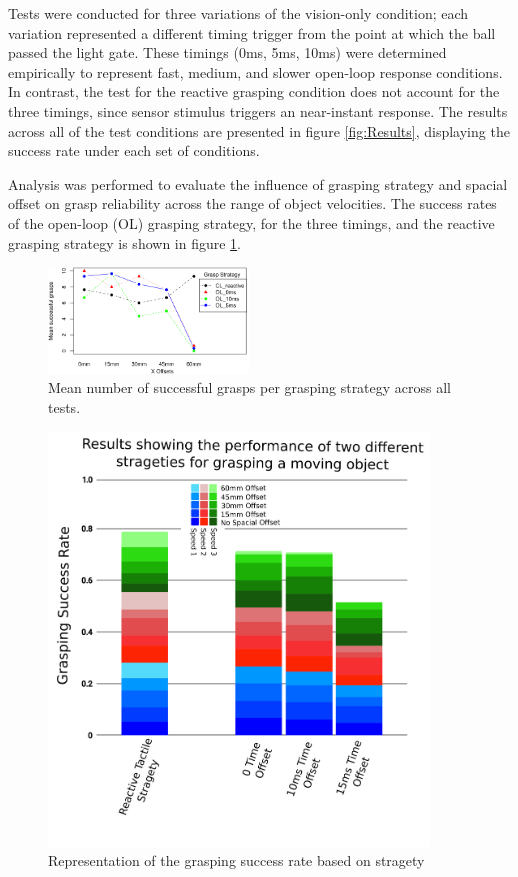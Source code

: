 Tests were conducted for three variations of the vision-only condition; each variation represented a different timing trigger from the point at which the ball passed the light gate. These timings (0ms, 5ms, 10ms) were determined empirically to represent fast, medium, and slower open-loop response conditions. In contrast, the test for the reactive grasping condition does not account for the three timings, since sensor stimulus triggers an near-instant response. The results across all of the test conditions are presented in figure \ref{fig:Results}, displaying the success rate under each set of conditions.

Analysis was performed to evaluate the influence of grasping strategy and spacial offset on grasp reliability across the range of object velocities. The success rates of the open-loop (OL) grasping strategy, for the three timings, and the reactive grasping strategy is shown in figure \ref{fig:meangraph}.

\begin{figure}[ht]
    \centering
    \includegraphics[width=0.475\textwidth]{Images/resultsgraph.png}
    \caption{Mean number of successful grasps per grasping strategy across all tests.}
    \label{fig:meangraph}
\end{figure}%

\begin{figure}[ht]
    \centering
    \includegraphics[width=0.9\textwidth]{Images/CrosslandResults.png}
    \caption{Representation of the grasping success rate based on stragety}
    \label{fig:CrosslandGraph}
\end{figure}%

